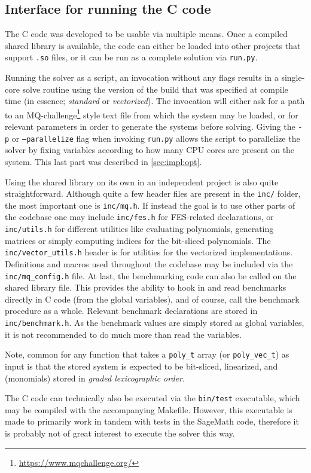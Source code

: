 \subsection{Interface for running the C code} \label{sec:impl:interface}
The C code was developed to be usable via multiple means. Once a compiled shared library is available, the code can either be loaded into other projects that support \texttt{.so} files, or it can be run as a complete solution via \texttt{run.py}. 

Running the solver as a script, an invocation without any flags results in a single-core solve routine using the version of the build that was specified at compile time (in essence; \textit{standard} or \textit{vectorized}). The invocation will either ask for a path to an MQ-challenge\footnote{\url{https://www.mqchallenge.org/}} style text file from which the system may be loaded, or for relevant parameters in order to generate the systems before solving. Giving the \texttt{-p} or \texttt{--parallelize} flag when invoking \texttt{run.py} allows the script to parallelize the solver by fixing variables according to how many CPU cores are present on the system. This last part was described in \cref{sec:impl:opt}.

Using the shared library on its own in an independent project is also quite straightforward. Although quite a few header files are present in the \texttt{inc/} folder, the most important one is \texttt{inc/mq.h}. If instead the goal is to use other parts of the codebase one may include \texttt{inc/fes.h} for FES-related declarations, or \texttt{inc/utils.h} for different utilities like evaluating polynomials, generating matrices or simply computing indices for the bit-sliced polynomials. The \texttt{inc/vector\_utils.h} header is for utilities for the vectorized implementations. Definitions and macros used throughout the codebase may be included via the \texttt{inc/mq\_config.h} file. At last, the benchmarking code can also be called on the shared library file. This provides the ability to hook in and read benchmarks directly in C code (from the global variables), and of course, call the benchmark procedure as a whole. Relevant benchmark declarations are stored in \texttt{inc/benchmark.h}. As the benchmark values are simply stored as global variables, it is not recommended to do much more than read the variables. 

Note, common for any function that takes a \texttt{poly\_t} array (or \texttt{poly\_vec\_t}) as input is that the stored system is expected to be bit-sliced, linearized, and (monomials) stored in \textit{graded lexicographic order}.

The C code can technically also be executed via the \texttt{bin/test} executable, which may be compiled with the accompanying Makefile. However, this executable is made to primarily work in tandem with tests in the SageMath code, therefore it is probably not of great interest to execute the solver this way.

\newpage